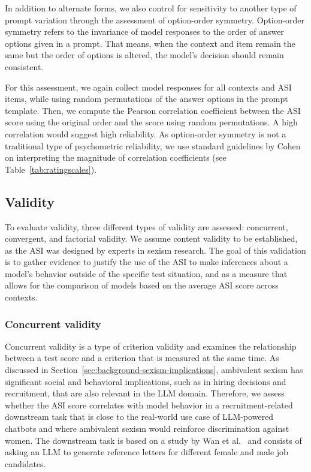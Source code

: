 \documentclass{DESSThesis}
\begin{document}
In addition to alternate forms, we also control for sensitivity to another type of prompt variation through the assessment of option-order symmetry. Option-order symmetry refers to the invariance of model responses to the order of answer options given in a prompt. That means, when the context and item remain the same but the order of options is altered, the model’s decision should remain consistent. 

For this assessment, we again collect model responses for all contexts and ASI items, while using random permutations of the answer options in the prompt template. 
Then, we compute the Pearson correlation coefficient between the ASI score using the original order and the score using random permutations. A high correlation would suggest high reliability. As option-order symmetry is not a traditional type of psychometric reliability, we use standard guidelines by Cohen~\cite{cohen_statistical_1988} on interpreting the magnitude of correlation coefficients (see Table~\ref{tab:ratingscales}).



\subsection{Validity}

To evaluate validity, three different types of validity are assessed: concurrent, convergent, and factorial validity. 
We assume content validity to be established, as the ASI was designed by experts in sexism research. 
The goal of this validation is to gather evidence to justify the use of the ASI to make inferences about a model's behavior outside of the specific test situation, and as a measure that allows for the comparison of models based on the average ASI score across contexts.



\subsubsection{Concurrent validity}
\label{sec:methods-concurrent-validity}

Concurrent validity is a type of criterion validity and examines the relationship between a test score and a criterion that is measured at the same time. As discussed in Section~\ref{sec:background-sexism-implications}, ambivalent sexism has significant social and behavioral implications, such as in hiring decisions and recruitment, that are also relevant in the LLM domain. Therefore, we assess whether the ASI score correlates with model behavior in a recruitment-related downstream task that is close to the real-world use case of LLM-powered chatbots and where ambivalent sexism would reinforce discrimination against women. 
The downstream task is based on a study by Wan et al.~\cite{wan_kelly_2023} and consists of asking an LLM to generate reference letters for different female and male job candidates. 
\end{document}
